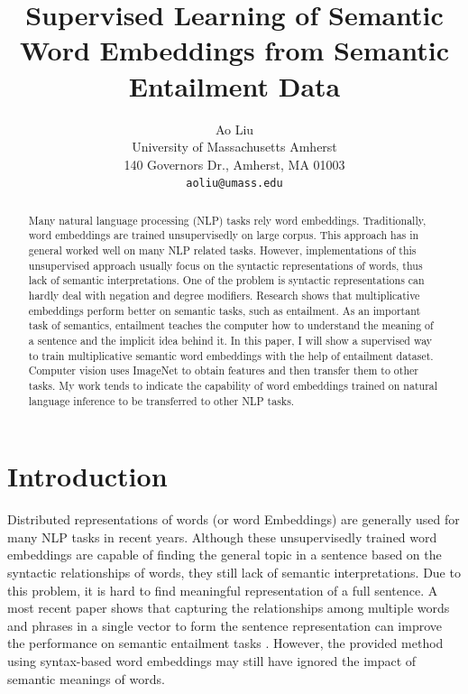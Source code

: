 \documentclass[10pt,twocolumn,letterpaper]{article}
\begin{document}
\title{Supervised Learning of Semantic Word Embeddings from Semantic Entailment Data}

\author{Ao Liu\\
University of Massachusetts Amherst\\
140 Governors Dr., Amherst, MA 01003 \\
{\tt\small aoliu@umass.edu}
}

\maketitle
\begin{abstract}
Many natural language processing (NLP) tasks rely word embeddings. Traditionally, word embeddings are trained unsupervisedly on large corpus. This approach has in general worked well on many NLP related tasks. However, implementations of this unsupervised approach usually focus on the syntactic representations of words, thus lack of semantic interpretations. One of the problem is syntactic representations can hardly deal with negation and degree modifiers. Research shows that multiplicative embeddings perform better on semantic tasks, such as entailment. As an important task of semantics, entailment teaches the computer how to understand the meaning of a sentence and the implicit idea behind it. In this paper, I will show a supervised way to train multiplicative semantic word embeddings with the help of entailment dataset. Computer vision uses ImageNet to obtain features and then transfer them to other tasks. My work tends to indicate the capability of word embeddings trained on natural language inference to be transferred to other NLP tasks.
\end{abstract}

\section{Introduction}
Distributed representations of words (or word Embeddings)\cite{bengio2003neural, collobert2011natural, mikolov2013distributed, pennington2014glove} are generally used for many NLP tasks in recent years. Although these unsupervisedly trained word embeddings are capable of finding the general topic in a sentence based on the syntactic relationships of words, they still lack of semantic interpretations. Due to this problem, it is hard to find meaningful representation of a full sentence. A most recent paper shows that capturing the relationships among multiple words and phrases in a single vector to form the sentence representation can improve the performance on semantic entailment tasks \cite{conneau2017supervised}. However, the provided method using syntax-based word embeddings may still have ignored the impact of semantic meanings of words.
\end{document}

